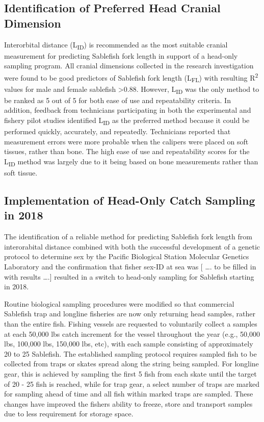 \documentclass[12pt]{article}\usepackage[]{graphicx}\usepackage[]{color}
\begin{document}
\hypertarget{identification-of-preferred-head-cranial-dimension}{%
\subsection{Identification of Preferred Head Cranial Dimension}\label{identification-of-preferred-head-cranial-dimension}}

Interorbital distance (L\textsubscript{ID}) is recommended as the most suitable cranial measurement for predicting Sablefish fork length in support of a head-only sampling program. All cranial dimensions collected in the research investigation were found to be good predictors of Sablefish fork length (L\textsubscript{FL}) with resulting R\textsuperscript{2} values for male and female sablefish \textgreater0.88. However, L\textsubscript{ID} was the only method to be ranked as 5 out of 5 for both ease of use and repeatability criteria. In addition, feedback from technicians participating in both the experimental and fishery pilot studies identified L\textsubscript{ID} as the preferred method because it could be performed quickly, accurately, and repeatedly. Technicians reported that measurement errors were more probable when the calipers were placed on soft tissues, rather than bone. The high ease of use and repeatability scores for the L\textsubscript{ID} method was largely due to it being based on bone measurements rather than soft tissue.

\hypertarget{implementation-of-head-only-catch-sampling-in-2018}{%
\subsection{Implementation of Head-Only Catch Sampling in 2018}\label{implementation-of-head-only-catch-sampling-in-2018}}

The identification of a reliable method for predicting Sablefish fork length from interorabital distance combined with both the successful development of a genetic protocol to determine sex by the Pacific Biological Station Molecular Genetics Laboratory and the confirmation that fisher sex-ID at sea was {[} \ldots. to be filled in with results \ldots.{]} resulted in a switch to head-only sampling for Sablefish starting in 2018.

Routine biological sampling procedures were modified so that commercial Sablefish trap and longline fisheries are now only returning head samples, rather than the entire fish. Fishing vessels are requested to voluntarily collect a samples at each 50,000 lbs catch increment for the vessel throughout the year (e.g., 50,000 lbs, 100,000 lbs, 150,000 lbs, etc), with each sample consisting of approximately 20 to 25 Sablefish. The established sampling protocol requires sampled fish to be collected from traps or skates spread along the string being sampled. For longline gear, this is achieved by sampling the first 5 fish from each skate until the target of 20 - 25 fish is reached, while for trap gear, a select number of traps are marked for sampling ahead of time and all fish within marked traps are sampled. These changes have improved the fishers ability to freeze, store and transport samples due to less requirement for storage space.
\end{document}
